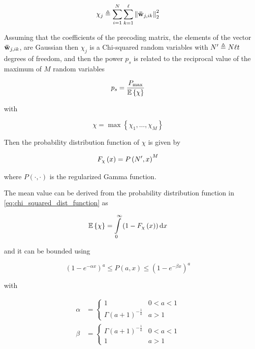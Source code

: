 \begin{equation} \label{eq:chi_squared_j}
    \chi_j \triangleq \sum\limits_{i = 1}^N \sum\limits_{k = 1}^\ell \left\|
    \mathbf{\bar{w}}_{j, ik} \right\|_2^2
\end{equation}

Assuming that the coefficients of the precoding matrix, \ie the elements
of the vector $\mathbf{\bar{w}}_{j, ik}$, are Gaussian then $\chi_j$ is a Chi-squared
random variables with $N^{\prime} \triangleq N\ell t$ degrees of freedom, and then
the power $p_s$ is related to the reciprocal value of the maximum of $M$ random
variables

\begin{equation} \label{eq:ps_reciprocal}
    p_s = \frac{P_{\max}}{\mathbb{E}\left\{\chi\right\}}
\end{equation}

\noindent
with

\begin{equation} \label{eq:chi_squared}
    \chi = \max\left\{\chi_1, \ldots, \chi_M\right\}
\end{equation}

Then the probability distribution function of $\chi$ is given by

\begin{equation} \label{eq:chi_squared_dist_function}
    F_{\chi}\left(x\right) = P\left(N^{\prime}, x\right)^M
\end{equation}

\noindent
where $P\left(\cdot,\cdot\right)$ is the regularized Gamma function.

The mean value can be derived from the probability distribution function in
\eqref{eq:chi_squared_dist_function} as

\begin{equation} \label{eq:chi_squared_mean}
    \mathbb{E}\left\{\chi\right\} = \int\limits_0^\infty \left( 1 - F_{\chi}
    \left(x\right)\right) \text{d} x
\end{equation}

\noindent
and it can be bounded using

\begin{equation} \label{eq:bound_reg_gamma}
    \left(1 - e^{-\alpha x}\right)^a \leq P\left(a,x\right) \leq
    \left(1 - e^{-\beta x}\right)^a
\end{equation}

\noindent
with

\begin{equation} \label{eq:bound_parameters}
\begin{aligned}
    \alpha &= \begin{cases}
    1 & 0 < a < 1 \\
    \Gamma\left(a + 1\right)^{-\frac{1}{a}} & a > 1
    \end{cases} \\
    \beta &= \begin{cases}
    \Gamma\left(a + 1\right)^{-\frac{1}{a}} & 0 < a < 1 \\
    1 & a > 1
    \end{cases}
\end{aligned}
\end{equation}

